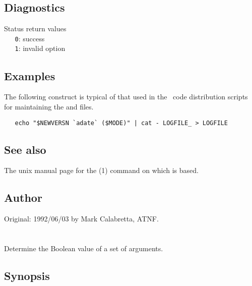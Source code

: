 \subsection*{Diagnostics}

Status return values
\\ \verb+   0+: success
\\ \verb+   1+: invalid option

\subsection*{Examples}

The following construct is typical of that used in the \aipspp\ code
distribution scripts for maintaining the  and 
files.

\begin{verbatim}
   echo "$NEWVERSN `adate` ($MODE)" | cat - LOGFILE_ > LOGFILE
\end{verbatim}

\subsection*{See also}

The unix manual page for the (1) command on which  is
based.

\subsection*{Author}

Original: 1992/06/03 by Mark Calabretta, ATNF.


\newpage
\section{}
\label{affirm}



Determine the Boolean value of a set of arguments.

\subsection*{Synopsis}

